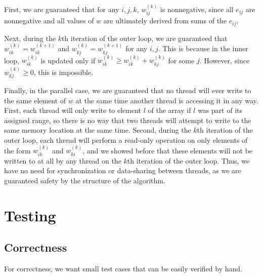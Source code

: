 \documentclass{article}
\begin{document}
First, we are guaranteed that for any $i, j, k$, $w_{ij}^{(k)}$ is nonnegative, since all $e_{ij}$ are nonnegative and all values of $w$ are ultimately derived from sums of the $e_{ij}$.

Next, during the $k$th iteration of the outer loop, we are guaranteed that $w_{ik}^{(k)}=w_{ik}^{(k+1)}$ and $w_{kj}^{(k)}=w_{kj}^{(k+1)}$ for any $i,j$. This is because in the inner loop, $w_{ik}^{(k)}$ is updated only if $w_{ik}^{(k)}\ge w_{ik}^{(k)}+w_{kj}^{(k)}$ for some $j$. However, since $w_{kj}^{(k)}\geq0$, this is impossible.

Finally, in the parallel case, we are guaranteed that no thread will ever write to the same element of $w$ at the same time another thread is accessing it in any way. First, each thread will only write to element $l$ of the array if $l$ was part of its assigned range, so there is no way that two threads will attempt to write to the same memory location at the same time. 
Second, during the $k$th iteration of the outer loop, each thread will perform a read-only operation on only elements of the form $w_{ik}^{(k)}$ and $w_{ki}^{(k)}$, and we showed before that these elements will not be written to at all by any thread on the $k$th iteration of the outer loop. Thus, we have no need for synchronization or data-sharing between threads, as we are guaranteed safety by the structure of the algorithm.
\section*{Testing}
\subsection*{Correctness}
For correctness, we want small test cases that can be easily verified by hand. 
\end{document}
